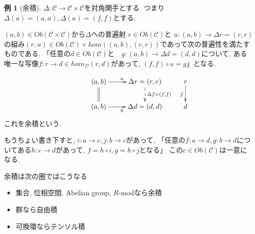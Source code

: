 \documentclass[dvipdfmx,a4paper,11pt]{report}
\theoremstyle{definition}
\newtheorem{exa}[thm]{例}
\begin{document}
\begin{exa}[余積]
$\Delta : \mathcal{C} \to \mathcal{C}  \times \mathcal{C} $を対角関手とする.
つまり$\Delta(a)=(a,a), \Delta(a)=(f,f)$とする.

$(a,b) \in Ob(\mathcal{C}  \times \mathcal{C})$から$\Delta$への普遍射
$r \in Ob(\mathcal{C})$と $u: (a,b) \to \Delta r = (r,r)$の組み$(r,u) \in Ob(\mathcal{C})\times hom((a,b), (r,r))$であって次の普遍性を満たすものである.
「任意の$d \in Ob(\mathcal{C} )$と　$g : (a,b)\to \Delta d = (d,d)$について, ある唯一な写像$f : r \to d \in hom_{\mathcal{D}}(r,d)$があって, $(f,f) \circ u = g$」となる.

\begin{equation*}
\xymatrix@C=25pt@R=20pt{
&(a,b)\ar@{=}[d]  \ar@{->}[r]^{u} & \Delta r = (r,r)\ar@{-->}[d]^{\Delta f= (f,f)} &r\ar@{->}[d]_{f}\\
&(a,b)\ar@{->}[r]_{g} &\Delta d = (d,d)&d \\   
}
\end{equation*}
これを余積という.

もうちょい書き下すと, $i : a \to c, j: b\to c$があって, 
「任意の$f : a \to d, g : b \to d$についてある$h : c \to d$があって, $f = h\circ i, g = h\circ j$となる」 この$c \in Ob(\mathcal{C})$は一意になる. 

余積は次の圏ではこうなる
\begin{itemize}
\item 集合, 位相空間, Abelian group, $R$-modなら余積
\item 群なら自由積
\item 可換環ならテンソル積
\end{itemize}
\end{exa}
\end{document}
